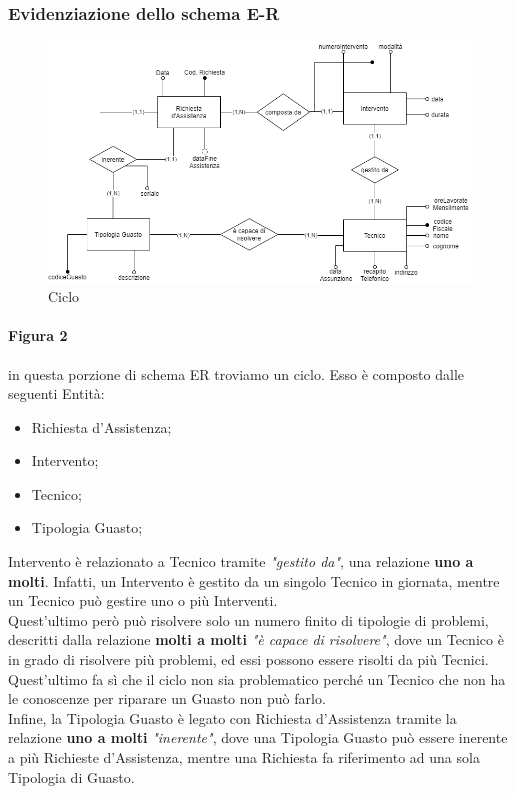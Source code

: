 \documentclass[legalpaper]{article}
\begin{document}
\subsubsection{Evidenziazione dello schema E-R}



\begin{figure}[!ht]
	\centering
	\begin{minipage}[b]{0.8\textwidth}
		\includegraphics[width=\linewidth]{image/ciclo.png}
			\caption{Ciclo}
		\label{fig:ciclo}

	\end{minipage}
\hfill

\end{figure}

\paragraph{Figura 2}
in questa porzione di schema ER troviamo un ciclo. Esso è composto dalle seguenti Entità: 
		\begin{itemize}
			\item Richiesta d'Assistenza;
			\item Intervento;
			\item Tecnico;
			\item Tipologia Guasto;
		\end{itemize}
		
		Intervento è relazionato a Tecnico tramite \textit{"gestito da"}, una relazione \textbf{uno a molti}. Infatti, un Intervento è gestito da un singolo Tecnico in giornata, mentre un Tecnico può gestire uno o più Interventi.\\
		Quest'ultimo però può risolvere solo un numero finito di tipologie di problemi, descritti dalla relazione \textbf{molti a molti} \textit{"è capace di risolvere"}, dove un Tecnico è in grado di risolvere più problemi, ed essi possono essere risolti da più Tecnici.\\
		Quest'ultimo fa sì che il ciclo non sia problematico perché un Tecnico che non ha le conoscenze per riparare un Guasto non può farlo.\\
		Infine, la Tipologia Guasto è legato con Richiesta d'Assistenza tramite la relazione \textbf{uno a molti} \textit{"inerente"}, dove una Tipologia Guasto può essere inerente a più Richieste d'Assistenza, mentre una Richiesta fa riferimento ad una sola Tipologia di Guasto.\pagebreak
\end{document}
